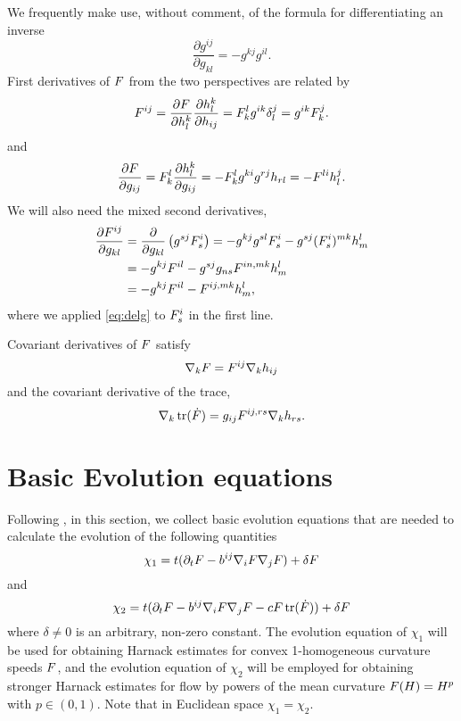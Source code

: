 \documentclass{amsart}
\begin{document}
We frequently make use, without comment, of the formula for differentiating an inverse
\[
\frac{\partial g^{ij}}{\partial g_{kl}} = - g^{kj} g^{il}.
\]
First derivatives of \(F\) from the two perspectives are related by
\begin{equation}
\label{eq:delh}
F^{ij} = \frac{\partial F}{\partial h_l^k} \frac{\partial h_l^k}{\partial h_{ij}} = F^l_k g^{ik} \delta^j_l = g^{ik} F^j_k.
\end{equation}
and
\begin{equation}
\label{eq:delg}
\frac{\partial F}{\partial g_{ij}} = F^{l}_{k} \frac{\partial h^{k}_{l}}{\partial g_{ij}} = -F^{l}_{k} g^{ki} g^{rj} h_{rl} = -F^{li}h^{j}_{l}.
\end{equation}
We will also need the mixed second derivatives,
\begin{equation}
\label{eq:delhdelg}
\begin{split}
\frac{\partial F^{ij}}{\partial g_{kl}} &= \frac{\partial}{\partial g_{kl}} \left(g^{sj} F^{i}_{s} \right) = - g^{kj}g^{sl} F^{i}_{s} - g^{sj} (F^i_s)^{mk} h^l_m \\
&= - g^{kj} F^{il} - g^{sj} g_{ns} F^{in,mk} h^l_m \\
&= - g^{kj} F^{il} - F^{ij,mk} h^l_m,
\end{split}
\end{equation}
where we applied \cref{eq:delg} to \(F^i_s\) in the first line.

Covariant derivatives of \(F\) satisfy
\begin{equation}
\label{eq:delphi}
\nabla_k F = F^{ij} \nabla_k h_{ij}
\end{equation}
and the covariant derivative of the trace,
\begin{equation}
\label{eq:delPhi}
\nabla_k \operatorname{tr}(\dot{F}) = g_{ij} F^{ij,rs} \nabla_k h_{rs}.
\end{equation}

\section{Basic Evolution equations}
\label{sec:basic_evolution}

Following \cite{Andrews:09/1994, Chow:06/1991, Hamilton:/1995, Smoczyk:/1997}, in this section, we collect basic evolution equations that are needed to calculate the evolution of the following quantities
\[
\chi_1 =t(\partial_t F- b^{ij} \nabla_i F \nabla_j F) +\delta F
\]
and
\[
\chi_2 =t(\partial_t F - b^{ij} \nabla_i F \nabla_j F - c F \operatorname{tr}(\dot{F})) +\delta F
\]
where \(\delta \ne 0\) is an arbitrary, non-zero constant. The evolution equation of $\chi_1$ will be used for obtaining Harnack estimates for convex 1-homogeneous curvature speeds $F$, and the evolution equation of $\chi_2$ will be employed for obtaining stronger Harnack estimates for flow by powers of the mean curvature $F(H)=H^{p}$ with $p\in(0,1).$ Note that in Euclidean space $\chi_1=\chi_2.$
\end{document}
